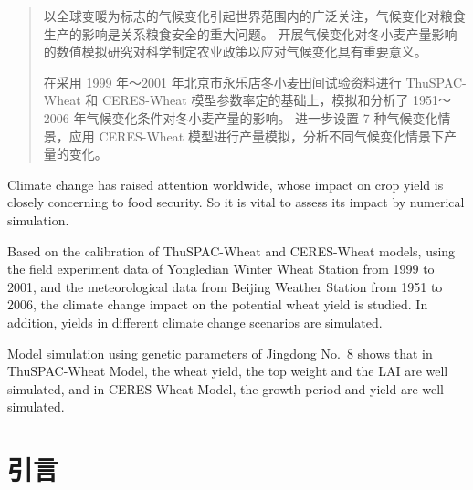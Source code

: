 \documentclass[degree=bachelor]{thuthesis}
\begin{document}
\START
\showoutput


\copyrightpage

\frontmatter

\begin{abstract}
  以全球变暖为标志的气候变化引起世界范围内的广泛关注，气候变化对粮食生产的影响是关系粮食安全的重大问题。
  开展气候变化对冬小麦产量影响的数值模拟研究对科学制定农业政策以应对气候变化具有重要意义。

  在采用 1999 年～2001 年北京市永乐店冬小麦田间试验资料进行 ThuSPAC-Wheat 和 CERES-Wheat 模型参数率定的基础上，模拟和分析了 1951～2006 年气候变化条件对冬小麦产量的影响。
  进一步设置 7 种气候变化情景，应用 CERES-Wheat 模型进行产量模拟，分析不同气候变化情景下产量的变化。

\end{abstract}


\begin{abstract*}
  Climate change has raised attention worldwide, whose impact on crop yield is closely concerning to food security.
  So it is vital to assess its impact by numerical simulation.

  Based on the calibration of ThuSPAC-Wheat and CERES-Wheat models, using the field experiment data of Yongledian Winter Wheat Station from 1999 to 2001, and the meteorological data from Beijing Weather Station from 1951 to 2006, the climate change impact on the potential wheat yield is studied.
  In addition, yields in different climate change scenarios are simulated.

  Model simulation using genetic parameters of Jingdong No.~8 shows that in ThuSPAC-Wheat Model, the wheat yield, the top weight and the LAI are well simulated, and in CERES-Wheat Model, the growth period and yield are well simulated.

\end{abstract*}


\tableofcontents



\mainmatter

\chapter{引言}
\end{document}
